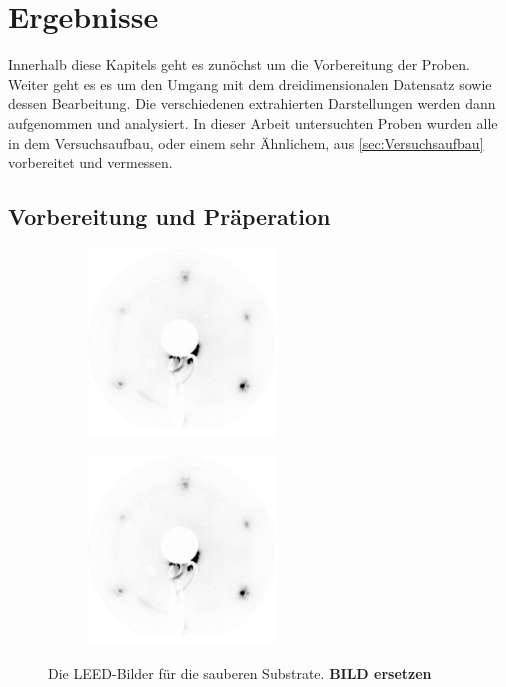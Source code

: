 \chapter{Ergebnisse}
    Innerhalb diese Kapitels geht es zunöchst um die Vorbereitung der Proben.
    Weiter geht es es um den Umgang mit dem dreidimensionalen Datensatz sowie dessen Bearbeitung.
    Die verschiedenen extrahierten Darstellungen werden dann aufgenommen und analysiert.
    In dieser Arbeit untersuchten Proben wurden alle in dem Versuchsaufbau, oder einem sehr Ähnlichem, aus \autoref{sec:Versuchsaufbau} vorbereitet und vermessen.

    \section{Vorbereitung und Präperation}
    \label{sec:Praep}
        \begin{figure}
            \centering
            \begin{subfigure}{0.48\textwidth}
                \centering
                \includegraphics[height=5cm]{./content/2021_06_08_002_Au(111)_75eV}
            \end{subfigure}
            \begin{subfigure}{0.48\textwidth}
                \centering
                \includegraphics[height=5cm]{./content/2021_06_08_002_Au(111)_75eV}
            \end{subfigure}
            \caption{Die LEED-Bilder für die sauberen Substrate. \textbf{BILD ersetzen}}
        \label{fig:Substrate}
        \end{figure}
